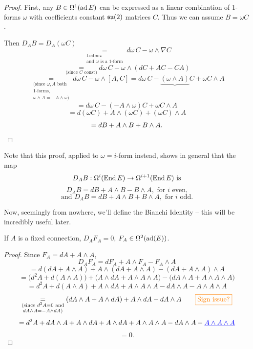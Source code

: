 \documentclass[main]{subfiles}
\begin{document}
\begin{proof}
First, any $B\in\Omega^1(\operatorname{ad} E)$ can be expressed as a linear combination of $1$-forms $\omega$ with coefficients constant $\mathfrak{su}(2)$ matrices $C$. Thus we can assume $B=\omega C$.

Then $D_AB = D_A(\omega C)$
\[
\underset{\substack{\text{Leibniz}\\\text{and }\omega \text{ is a 1-form}}}{=} d\omega\, C - \omega\wedge\nabla C
\]
\[
\underset{\text{(since } C \text{ const)}}{=} d\omega\, C - \omega\wedge(dC+AC-CA)
\]
\[
\underset{\substack{\text{(since }\omega,A \text{ both}\\ \text{1-forms,}\\ \omega\wedge A = -A\wedge\omega\text{)}}}{=} d\omega\, C - \omega\wedge[A,C] = d\omega\, C - \underbrace{(\omega\wedge A)}_{}C + \omega C\wedge A
\]
\[
= d\omega\, C - (-A\wedge\omega)C + \omega C\wedge A
\]
\[
= d(\omega C) + A\wedge(\omega C) + (\omega C)\wedge A
\]
\[
= dB + A\wedge B + B\wedge A. \qedhere
\]
\end{proof}

Note that this proof, applied to $\omega=i$-form instead, shows in general that the map
\[
D_AB : \Omega^i(\operatorname{End} E) \to \Omega^{i+1}(\operatorname{End} E) \text{ is}
\]
\[
D_AB = dB+A\wedge B - B\wedge A, \text{ for } i \text{ even,}
\]
\[
\text{and } D_AB = dB+A\wedge B+B\wedge A, \text{ for } i \text{ odd.}
\]

Now, seemingly from nowhere, we'll define the Bianchi Identity -- this will be incredibly useful later.

\begin{theorem}
If $A$ is a fixed connection, $D_AF_A = 0$, $F_A\in\Omega^2(\operatorname{ad}(E))$.
\end{theorem}

\begin{proof}
Since $F_A = dA+A\wedge A$,
\[
D_AF_A = dF_A + A\wedge F_A - F_A\wedge A
\]
\[
= d(dA+A\wedge A) + A\wedge(dA+A\wedge A) - (dA+A\wedge A)\wedge A
\]
\[
= \big(d^2A+d(A\wedge A)\big) + \big(A\wedge dA+A\wedge A\wedge A\big) - \big(dA\wedge A+A\wedge A\wedge A\big)
\]
\[
= d^2A + d(A\wedge A) + A\wedge dA + A\wedge A\wedge A - dA\wedge A - A\wedge A\wedge A
\]
\[
\underset{\substack{\text{(since } d^2A=0 \text{ and}\\ dA\wedge A = -A\wedge dA\text{)}}}{=} (dA\wedge A+A\wedge dA)+A\wedge dA - dA\wedge A \qquad \textcolor{orange}{\fbox{Sign issue?}}
\]
\[
= d^2A+dA\wedge A+A\wedge dA+A\wedge dA+A\wedge A\wedge A - dA\wedge A - \textcolor{blue}{\underline{A\wedge A\wedge A}}
\]
\[
= 0.
\]
\end{proof}
\end{document}
